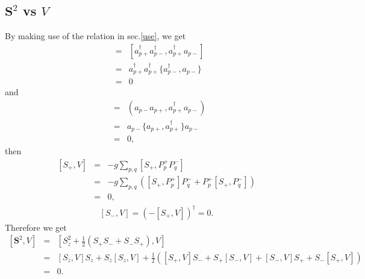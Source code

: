\documentclass{article}
\begin{document}
\subsection{$\bm{S}^2$ vs $V$}
By making use of the relation in sec.\ref{use}, we get
\begin{eqnarray*}
[P_p^{+},S_+] &=& [a_{p+}^{\dagger}a_{p-}^{\dagger} , a_{p+}^{\dagger} a_{p-} ] \\
&=& a_{p+}^{\dagger} a_{p+}^{\dagger} \bigl\{ a_{p-}^{\dagger} , a_{p-}  \bigr\} \\
&=& 0
\end{eqnarray*}
and
\begin{eqnarray*}
[P_p^{-},S_+] &=& \left( a_{p-} a_{p+} , a_{p+}^{\dagger} a_{p-} \right) \\
&=& a_{p-}  \bigl\{ a_{p+} , a_{p+}^{\dagger}  \bigr\} a_{p-} \\
&=& 0,
\end{eqnarray*}
then
\begin{eqnarray*}
\left[ S_{+},V \right] &=& -g \sum_{p,q} [S_{+},P_p^{+}P_q^{-}] \\
&=& -g \sum_{p,q} \left( [S_{+},P_p^{+}]P_q^{-} + P_p^{+} [S_{+},P_q^{-}] \right) \\
&=& 0,
\end{eqnarray*}
\begin{eqnarray*}
\left[ S_{-},V \right] = \left( - [S_{+} , V ] \right)^{\dagger} = 0.
\end{eqnarray*}
Therefore we get
\begin{eqnarray*}
\left[ \bm{S}^2,V \right] &=& [ S_z^2 + \frac{1}{2}(S_{+}S_{-} + S_{-}S_{+}) , V ] \\
&=& [S_z,V]S_z + S_z[S_z,V] + \frac{1}{2} \left( [S_{+},V] S_{-} + S_{+} [S_{-},V] + [S_{-},V] S_{+} + S_{-} [S_{+},V] \right) \\
&=& 0.
\end{eqnarray*}
\end{document}

